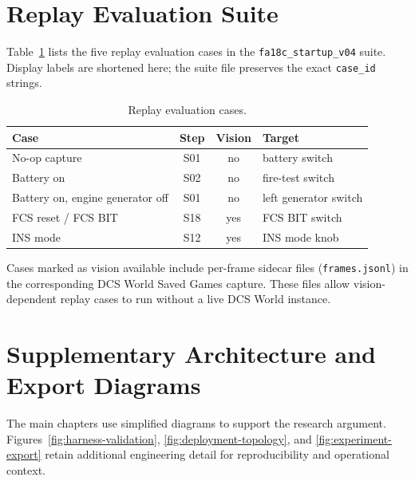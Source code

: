 \section{Replay Evaluation Suite}\label{sec:appendix-replay}

Table~\ref{tab:replay-cases} lists the five replay evaluation cases in the
\texttt{fa18c\_startup\_v04} suite. Display labels are shortened here; the
suite file preserves the exact \texttt{case\_id} strings.

\begin{table}[htbp]
\centering
\caption{Replay evaluation cases.}
\label{tab:replay-cases}
\small
\begin{tabularx}{\textwidth}{@{}>{\raggedright\arraybackslash}Xccl@{}}
\toprule
\textbf{Case} & \textbf{Step} & \textbf{Vision} & \textbf{Target} \\
\midrule
No-op capture & S01 & no & battery switch \\
Battery on & S02 & no & fire-test switch \\
Battery on, engine generator off & S01 & no & left generator switch \\
FCS reset / FCS BIT & S18 & yes & FCS BIT switch \\
INS mode & S12 & yes & INS mode knob \\
\bottomrule
\end{tabularx}
\end{table}


Cases marked as vision available include per-frame sidecar files
(\texttt{frames.jsonl}) in the corresponding DCS World Saved Games capture.
These files allow vision-dependent replay cases to run without a live DCS World
instance.

\section{Supplementary Architecture and Export Diagrams}\label{sec:appendix-figures}

The main chapters use simplified diagrams to support the research argument.
Figures~\ref{fig:harness-validation}, \ref{fig:deployment-topology}, and
\ref{fig:experiment-export} retain additional engineering detail for
reproducibility and operational context.

